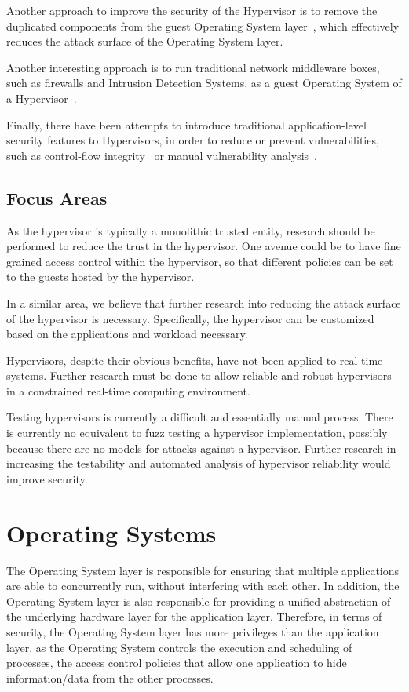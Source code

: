 \documentclass[11pt,letterpaper]{article}
\begin{document}
Another approach to improve the security of the Hypervisor is to
remove the duplicated components from the guest Operating System
layer~\cite{Kivity2014, Madhavapeddy2015}, which effectively reduces
the attack surface of the Operating System layer.

Another interesting approach is to run traditional network middleware
boxes, such as firewalls and Intrusion Detection Systems, as a guest
Operating System of a Hypervisor~\cite{Martins2014}.

Finally, there have been attempts to introduce traditional
application-level security features to Hypervisors, in order to reduce
or prevent vulnerabilities, such as control-flow
integrity~\cite{Wang2010} or manual vulnerability
analysis~\cite{Perez-Botero2013}.

\subsection{Focus Areas}

As the hypervisor is typically a monolithic trusted entity, research
should be performed to reduce the trust in the hypervisor. One avenue
could be to have fine grained access control within the hypervisor, so
that different policies can be set to the guests hosted by the
hypervisor.

In a similar area, we believe that further research into reducing the
attack surface of the hypervisor is necessary. Specifically, the
hypervisor can be customized based on the applications and workload
necessary. 

Hypervisors, despite their obvious benefits, have not been applied to
real-time systems. Further research must be done to allow reliable and
robust hypervisors in a constrained real-time computing environment.

Testing hypervisors is currently a difficult and essentially manual
process. There is currently no equivalent to fuzz testing a hypervisor
implementation, possibly because there are no models for attacks
against a hypervisor. Further research in increasing the testability
and automated analysis of hypervisor reliability would improve security.

\section{Operating Systems}

The Operating System layer is responsible for ensuring that multiple
applications are able to concurrently run, without interfering with
each other. In addition, the Operating System layer is also
responsible for providing a unified abstraction of the underlying
hardware layer for the application layer. Therefore, in terms of
security, the Operating System layer has more privileges than the
application layer, as the Operating System controls the execution and
scheduling of processes, the access control policies that allow one
application to hide information/data from the other processes.
\end{document}

